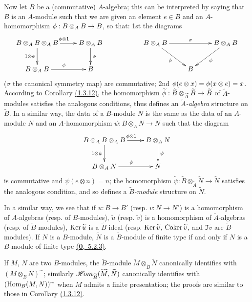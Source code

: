 \begin{env}[1.3.13]
\label{env-1.1.3.13}
Now let $B$ be a (commutative) $A$-algebra; this can be interpreted by saying that $B$ is an
$A$-module such that we are given an element $e\in B$ and an $A$-homomorphism
$\phi:B\otimes_A B\to B$, so that: 1st the diagrams
\[
  \xymatrix{
    B\otimes_A B\otimes_A B\ar[r]^{\vphi\otimes 1}\ar[d]_{1\otimes\vphi} &
    B\otimes_A B\ar[d]^\vphi & &
    B\otimes_A B\ar[rr]^\sigma\ar[rd]_\vphi & &
    B\otimes_A B\ar[dl]^\vphi\\
    B\otimes_A B\ar[r]^\vphi &
    B & & &
    B
  }
\]
($\sigma$ the canonical symmetry map) are commutative; 2nd
$\phi(e\otimes x)=\phi(x\otimes e)=x$. According to
Corollary \hyperref[cor-1.1.3.12]{(1.3.12)}, the homomorphism
$\widetilde{\phi}:\widetilde{B}\otimes_{\widetilde{A}}\widetilde{B}\to\widetilde{B}$ of
$\widetilde{A}$-modules satisfies the analogous conditions, thus defines an
{\em $\widetilde{A}$-algebra} structure on $\widetilde{B}$. In a similar way, the data of
a $B$-module $N$ is the same as the data of an $A$-module $N$ and an $A$-homomorphism
$\psi:B\otimes_A N\to N$ such that the diagram
\[
  \xymatrix{
    B\otimes_A B\otimes_A B\ar[r]^{\vphi\otimes 1}\ar[d]_{1\otimes\psi} &
    B\otimes_A N\ar[d]^\psi\\
    B\otimes_A N\ar[r]^\psi &
    N
  }
\]
is commutative and $\psi(e\otimes n)=n$; the homomorphism
$\widetilde{\psi}:\widetilde{B}\otimes_{\widetilde{A}}\widetilde{N}\to\widetilde{N}$
satisfies the analogous condition, and so defines a {\em $\widetilde{B}$-module} structure
on $\widetilde{N}$.

In a similar way, we see that if $u:B\to B'$ (resp. $v:N\to N'$) is a homomorphism of
$A$-algebras (resp. of $B$-modules), $\widetilde{u}$ (resp. $\widetilde{v}$) is a
homomorphism of $\widetilde{A}$-algebras (resp. of $\widetilde{B}$-modules),
${\mathop{\mathrm{Ker}}\nolimits}\,\widetilde{u}$ is a $\widetilde{B}$-ideal (resp. ${\mathop{\mathrm{Ker}}\nolimits}\,\widetilde{v}$,
${\mathop{\mathrm{Coker}}\nolimits}\,\widetilde{v}$, and $\Im\widetilde{v}$ are $\widetilde{B}$-modules). If $N$ is a
$B$-module, $\widetilde{N}$ is a $\widetilde{B}$-module of finite type if and only if $N$
is a $B$-module of finite type \hyperref[env-0.5.2.3]{(\textbf{0},~5.2.3)}.

If $M$, $N$ are two $B$-modules, the $\widetilde{B}$-module
$\widetilde{M}\otimes_{\widetilde{B}}\widetilde{N}$ canonically identifies with
$(M\otimes_B N)^\sim$; similarly $\mathscr{H}\!{om}_{\widetilde{B}}(\widetilde{M},\widetilde{N})$
canonically identifies with $({\mathop{\mathrm{Hom}}\nolimits}_B(M,N))^\sim$ when $M$ admits a finite presentation; the
proofs are similar to those in Corollary \hyperref[cor-1.1.3.12]{(1.3.12)}.


\end{env}
